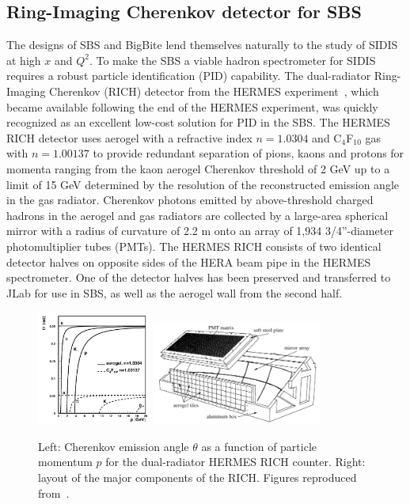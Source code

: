 %
%

\subsection{Ring-Imaging Cherenkov detector for SBS}
The designs of SBS and BigBite lend themselves naturally to the study of SIDIS at high $x$ and $Q^2$. To make the SBS a viable hadron spectrometer for SIDIS requires a robust particle identification (PID) capability. The dual-radiator Ring-Imaging Cherenkov (RICH) detector from the HERMES experiment~\cite{HERMES_RICH_long_NIM}, which became available following the end of the HERMES experiment, was quickly recognized as an excellent low-cost solution for PID in the SBS. The HERMES RICH detector uses aerogel with a refractive index $n = 1.0304$ and C$_4$F$_{10}$ gas with $n = 1.00137$ to provide redundant separation of pions, kaons and protons for momenta ranging from the kaon aerogel Cherenkov threshold of 2 GeV up to a limit of 15 GeV determined by the resolution of the reconstructed emission angle in the gas radiator. Cherenkov photons emitted by above-threshold charged hadrons in the aerogel and gas radiators are collected by a large-area spherical mirror with a radius of curvature of 2.2 m onto an array of 1,934 3/4''-diameter photomultiplier tubes (PMTs). The HERMES RICH consists of two identical detector halves on opposite sides of the HERA beam pipe in the HERMES spectrometer. One of the detector halves has been preserved and transferred to JLab for use in SBS, as well as the aerogel wall from the second half.
\begin{figure}[h]
  \begin{center}
    \includegraphics[width=0.33\textwidth]{figures/thetaC_vs_p.png}
    \includegraphics[width=0.5\textwidth]{figures/RICH_schematic.png}
  \end{center}
  \caption{\label{RICHfig1} Left: Cherenkov emission angle $\theta$ as a function of particle momentum $p$ for the dual-radiator HERMES RICH counter. Right: layout of the major components of the RICH. Figures reproduced from~\cite{HERMES_RICH_long_NIM}.}
\end{figure}
